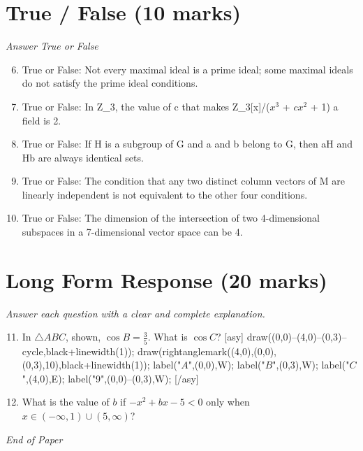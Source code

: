 \documentclass[12pt]{article}
\begin{document}
\section*{True / False (10 marks)}
\textit{Answer True or False}
\begin{enumerate}[label=\arabic*.]
\setcounter{enumi}{5}
\item True or False: Not every maximal ideal is a prime ideal; some maximal ideals do not satisfy the prime ideal conditions.
\item True or False: In Z\_3, the value of c that makes Z\_3[x]/($x^3$ + $cx^2$ + 1) a field is 2.
\item True or False: If H is a subgroup of G and a and b belong to G, then aH and Hb are always identical sets.
\item True or False: The condition that any two distinct column vectors of M are linearly independent is not equivalent to the other four conditions.
\item True or False: The dimension of the intersection of two 4-dimensional subspaces in a 7-dimensional vector space can be 4.
\end{enumerate}

\section*{Long Form Response (20 marks)}
\textit{Answer each question with a clear and complete explanation.}
\begin{enumerate}[label=\arabic*.]
\setcounter{enumi}{10}
\item In $\triangle{ABC}$, shown, $\cos{B}=\frac{3}{5}$. What is $\cos{C}$? [asy] draw((0,0)--(4,0)--(0,3)--cycle,black+linewidth(1)); draw(rightanglemark((4,0),(0,0),(0,3),10),black+linewidth(1)); label("$A$",(0,0),W); label("$B$",(0,3),W); label("$C$",(4,0),E); label("9",(0,0)--(0,3),W); [/asy]
\item What is the value of $b$ if $-x^2+bx-5<0$ only when $x\in (-\infty, 1)\cup(5,\infty)$?
\end{enumerate}

\vfill
\noindent\textit{End of Paper}
\end{document}
